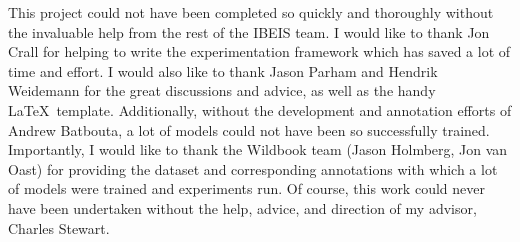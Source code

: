 This project could not have been completed so quickly and thoroughly without the invaluable help from the rest of the IBEIS team.
I would like to thank Jon Crall for helping to write the experimentation framework which has saved a lot of time and effort.
I would also like to thank Jason Parham and Hendrik Weidemann for the great discussions and advice, as well as the handy \LaTeX\ template. 
Additionally, without the development and annotation efforts of Andrew Batbouta, a lot of models could not have been so successfully trained. 
Importantly, I would like to thank the Wildbook team (Jason Holmberg, Jon van Oast) for providing the dataset and corresponding annotations with which a lot of models were trained and experiments run. 
Of course, this work could never have been undertaken without the help, advice, and direction of my advisor, Charles Stewart. 
